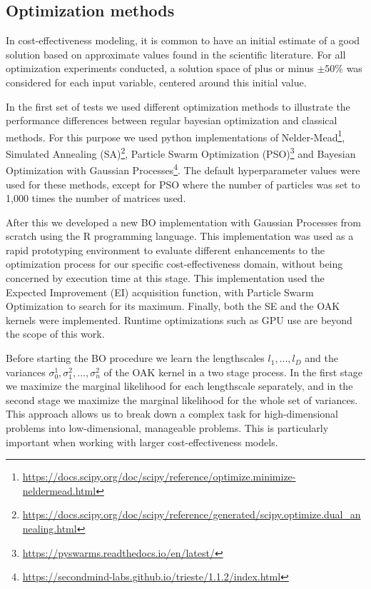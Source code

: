 \documentclass{IOS-Book-Article}
\begin{document}
	\subsection{Optimization methods}
	In cost-effectiveness modeling, it is common to have an initial estimate of a good solution based on approximate values found in the scientific literature. For all optimization experiments conducted, a solution space of plus or minus $\pm 50\%$ was considered for each input variable, centered around this initial value.
	
	In the first set of tests we used different optimization methods to illustrate the performance differences between regular bayesian optimization and classical methods. For this purpose we used python implementations of Nelder-Mead\footnote{\url{https://docs.scipy.org/doc/scipy/reference/optimize.minimize-neldermead.html}}, Simulated Annealing (SA)\footnote{\url{https://docs.scipy.org/doc/scipy/reference/generated/scipy.optimize.dual_annealing.html}}, Particle Swarm Optimization (PSO)\footnote{\url{https://pyswarms.readthedocs.io/en/latest/}} and Bayesian Optimization with Gaussian Processes\footnote{\url{https://secondmind-labs.github.io/trieste/1.1.2/index.html}}. The default hyperparameter values were used for these methods, except for PSO where the number of particles was set to 1,000 times the number of matrices used.
	
	After this we developed a new BO implementation with Gaussian Processes from scratch using the R programming language. This implementation was used as a rapid prototyping environment to evaluate different enhancements to the optimization process for our specific cost-effectiveness domain, without being concerned by execution time at this stage. This implementation used the Expected Improvement (EI) acquisition function, with Particle Swarm Optimization to search for its maximum. Finally, both the SE and the OAK kernels were implemented. Runtime optimizations such as GPU use are beyond the scope of this work.
	
	Before starting the BO procedure we learn the lengthscales $l_1, ..., l_D$ and the variances $\sigma_0^1, \sigma_1^2, ..., \sigma_n^2$ of the OAK kernel in a two stage process. In the first stage we maximize the marginal likelihood for each lengthscale separately, and in the second stage we maximize the marginal likelihood for the whole set of variances. This approach allows us to break down a complex task for high-dimensional problems into low-dimensional, manageable problems. This is particularly important when working with larger cost-effectiveness models.
	
\end{document}
